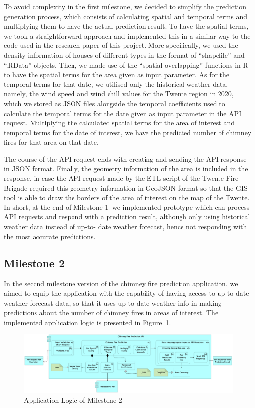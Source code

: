 \documentclass{utitcphd_overleaf}
\begin{document}
To avoid complexity in the first milestone, we decided to simplify the prediction generation process, which consists of calculating spatial and temporal terms and multiplying them to have the actual prediction result. To have the spatial terms, we took a straightforward approach and implemented this in a similar way to the code used in the research paper of this project. More specifically, we used the density information of houses of different types in the format of “shapefile” and “.RData” objects. Then, we made use of the “spatial overlapping” functions in R to have the spatial terms for the area given as input parameter. As for the temporal terms for that date, we utilised only the historical weather data, namely, the wind speed and wind chill values for the Twente region in 2020, which we stored as JSON files alongside the temporal coefficients used to calculate the temporal terms for the date given as input parameter in the API request. Multiplying the calculated spatial terms for the area of interest and temporal terms for the date of interest, we have the predicted number of chimney fires for that area on that date.

The course of the API request ends with creating and sending the API response in JSON format. Finally, the geometry information of the area is included in the response, in case the API request made by the ETL script of the Twente Fire Brigade required this geometry information in GeoJSON format so that the GIS tool is able to draw the borders of the area of interest on the map of the Twente. In short, at the end of Milestone 1, we implemented prototype which can process API requests and respond with a prediction result, although only using historical weather data instead of up-to- date weather forecast, hence not responding with the most accurate predictions.

\subsection{Milestone 2}

In the second milestone version of the chimney fire prediction application, we aimed to equip the application with the capability of having access to up-to-date weather forecast data, so that it uses up-to-date weather info in making predictions about the number of chimney fires in areas of interest. The implemented application logic is presented in Figure~\ref{fig:m2_logic}.

\begin{figure}[ht]
  \centering
  \includegraphics[width=1\textwidth]{my_images/milestones/m2.png}
  \caption{Application Logic of Milestone 2}
  \label{fig:m2_logic}
\end{figure}
\end{document}

